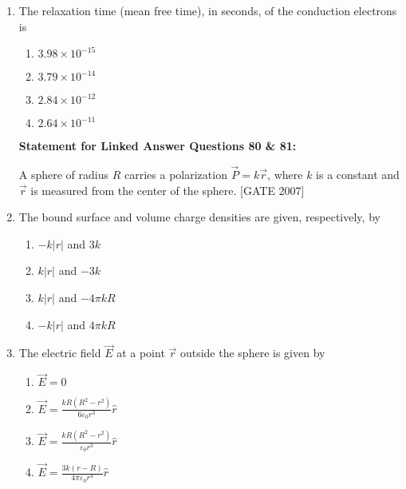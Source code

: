 \documentclass[journal,12pt,onecolumn]{IEEEtran}
\theoremstyle{remark}
\begin{document}
\begin{enumerate}
    \item The relaxation time (mean free time), in seconds, of the conduction electrons is
    \begin{multicols}{2}
    \begin{enumerate}
        \item $3.98 \times 10^{-15}$
        \item $3.79 \times 10^{-14}$
        \item $2.84 \times 10^{-12}$
        \item $2.64 \times 10^{-11}$
    \end{enumerate}
    \end{multicols}


\bigskip

\textbf{Statement for Linked Answer Questions 80 \& 81:}

A sphere of radius $R$ carries a polarization $\vec{P} = k\vec{r}$, where $k$ is a constant and $\vec{r}$ is measured from the center of the sphere.   \hfill{[GATE 2007]}


    \item  The bound surface and volume charge densities are given, respectively, by
    \begin{multicols}{2}
    \begin{enumerate}
        \item $-k|r|$ and $3k$
        \item $k|r|$ and $-3k$
        \item $k|r|$ and $-4\pi k R$
        \item $-k|r|$ and $4\pi k R$
    \end{enumerate}
    \end{multicols}

    \item  The electric field $\vec{E}$ at a point $\vec{r}$ outside the sphere is given by
    \begin{multicols}{2}
    \begin{enumerate}
        \item $\vec{E} = 0$\\
        \item $\vec{E} = \frac{kR(R^2 - r^2)}{6 \varepsilon_0 r^3} \hat{r}$
        \item $\vec{E} = \frac{kR(R^2 - r^2)}{\varepsilon_0 r^3} \hat{r}$\\
        \item $\vec{E} = \frac{3k(r - R)}{4\pi \varepsilon_0 r^4} \hat{r}$
    \end{enumerate}
    \end{multicols}




\end{enumerate}
\end{document}
